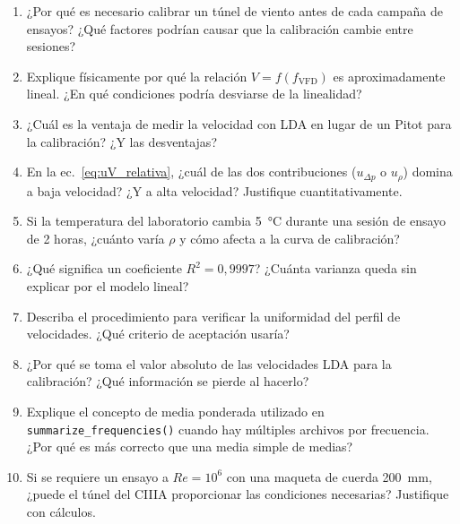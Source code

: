 \documentclass[12pt,a4paper]{article}
\begin{document}
\begin{enumerate}
	\item ¿Por qué es necesario calibrar un túnel de viento antes de cada campaña
	      de ensayos?  ¿Qué factores podrían causar que la calibración cambie
	      entre sesiones?

	\item Explique físicamente por qué la relación $V = f(f_\mathrm{VFD})$ es
	      aproximadamente lineal.  ¿En qué condiciones podría desviarse de la
	      linealidad?

	\item ¿Cuál es la ventaja de medir la velocidad con LDA en lugar de un Pitot
	      para la calibración?  ¿Y las desventajas?

	\item En la ec.~\eqref{eq:uV_relativa}, ¿cuál de las dos contribuciones
	      ($u_{\Delta p}$ o $u_\rho$) domina a baja velocidad?  ¿Y a alta
	      velocidad?  Justifique cuantitativamente.

	\item Si la temperatura del laboratorio cambia \SI{5}{\degreeCelsius}
	      durante una sesión de ensayo de 2 horas, ¿cuánto varía $\rho$ y
	      cómo afecta a la curva de calibración?

	\item ¿Qué significa un coeficiente $R^2 = 0{,}9997$?  ¿Cuánta varianza
	      queda sin explicar por el modelo lineal?

	\item Describa el procedimiento para verificar la uniformidad del perfil de
	      velocidades.  ¿Qué criterio de aceptación usaría?

	\item ¿Por qué se toma el valor absoluto de las velocidades LDA para la
	      calibración?  ¿Qué información se pierde al hacerlo?

	\item Explique el concepto de media ponderada utilizado en
	      \texttt{summarize\_frequencies()} cuando hay múltiples archivos por
	      frecuencia.  ¿Por qué es más correcto que una media simple de medias?

	\item Si se requiere un ensayo a $Re = 10^6$ con una maqueta de cuerda
	      \SI{200}{\mm}, ¿puede el túnel del CIIIA proporcionar las condiciones
	      necesarias?  Justifique con cálculos.
\end{enumerate}

\end{document}
